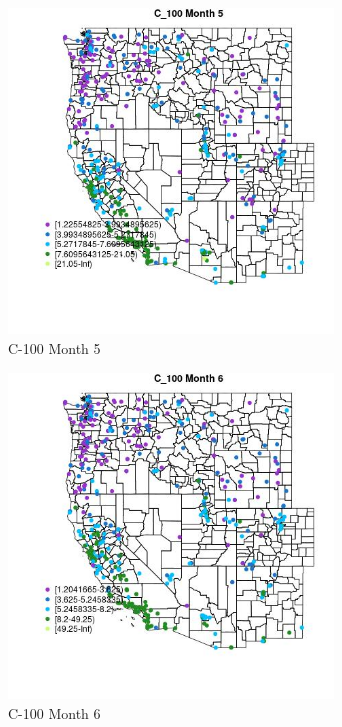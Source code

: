 \begin{figure} 
\centering  
\includegraphics[width=0.77\textwidth]{Code_Outputs/ML_input_report_ML_input_PM25_Step5_part_d_de_duplicated_aves_ML_input_MapObsMo5C_100.jpg} 
\caption{\label{fig:ML_input_report_ML_input_PM25_Step5_part_d_de_duplicated_aves_ML_inputMapObsMo5C_100}C-100 Month 5} 
\end{figure} 
 

\clearpage 

\begin{figure} 
\centering  
\includegraphics[width=0.77\textwidth]{Code_Outputs/ML_input_report_ML_input_PM25_Step5_part_d_de_duplicated_aves_ML_input_MapObsMo6C_100.jpg} 
\caption{\label{fig:ML_input_report_ML_input_PM25_Step5_part_d_de_duplicated_aves_ML_inputMapObsMo6C_100}C-100 Month 6} 
\end{figure} 
 

